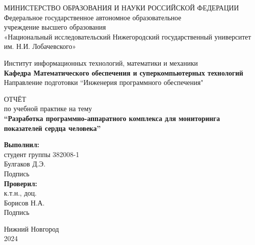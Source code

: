 \documentclass[12pt, russian]{extarticle}
\title{}
\author{}
\date{}
\begin{document}
    \begin{titlepage}

        \begin{center}
            МИНИСТЕРСТВО ОБРАЗОВАНИЯ И НАУКИ РОССИЙСКОЙ ФЕДЕРАЦИИ \\
            Федеральное государственное автономное образовательное \\
            учреждение высшего образования \\
            «Национальный исследовательский Нижегородский государственный университет им. Н.И. Лобачевского»\\
        \end{center}
        
        \bigbreak

        \begin{center}
            Институт информационных технологий, математики и механики \\
            {\bfseries Кафедра Математического обеспечения и суперкомпьютерных технологий} \\
            Направление подготовки ``Инженерия программного обеспечения"
        \end{center}

        \vspace{2em}
    
        \begin{center}
            ОТЧЁТ \\ по учебной практике на тему \\
            {\bfseries ``Разработка программно-аппаратного комплекса для мониторинга показателей сердца
            человека''}
        \end{center}

        \vspace{5em}
    
        \begin{flushright}
            {\bfseries Выполнил:} \\студент группы 382008-1\\Булгаков Д.Э.\\ 
            \hfill Подпись \hspace{5em} \newline \\ 
            {\bfseries Проверил:} \\к.т.н., доц.\\ Борисов Н.А. \\ 
            \hfill Подпись \hspace{5em} \newline \\
        \end{flushright}
    
    
        \vspace{\fill}
    
        \begin{center}
            Нижний Новгород\\2024
        \end{center}
    \end{titlepage}
\end{document}
